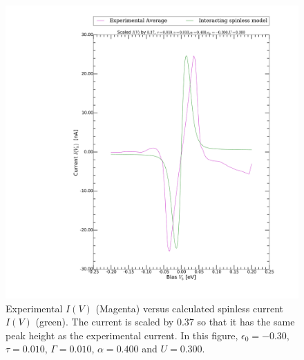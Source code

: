 \begin{figure}[htb]
    \centering
    \includegraphics[width=.95\textwidth, clip=true, trim=11cm 2cm 2cm 0cm]{pdf/fit/fit_spinless_5.pdf}
    \caption{Experimental $I(V)$ (Magenta) versus calculated spinless current $I(V)$ (green). The current is scaled by $0.37$ so that it has the same peak height as the experimental current. In this figure, $\epsilon_0=-0.30$, $\tau=0.010$, $\Gamma=0.010$, $\alpha=0.400$ and $U=0.300$.}
    \label{fig:fitspinless5}
\end{figure} 
